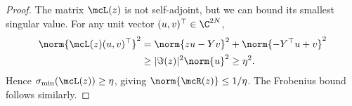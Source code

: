 \begin{proof}
The matrix $\mcL(z)$ is not self-adjoint, but we can bound its smallest singular value. For any unit vector $(u, v)^\top \in \C^{2N}$,
\begin{align}
\norm{\mcL(z)(u, v)^\top}^2
&= \norm{zu - Yv}^2 + \norm{-Y^\top u + v}^2 \\
&\geq |\Im(z)|^2 \norm{u}^2 \geq \eta^2.
\end{align}
Hence $\sigma_{\min}(\mcL(z)) \geq \eta$, giving $\norm{\mcR(z)} \leq 1/\eta$. The Frobenius bound follows similarly.
\end{proof}
